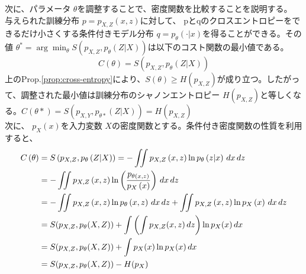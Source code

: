 \documentclass[a4paper]{jsarticle}%
\begin{document}

次に、パラメータ $ \theta $を調整することで、密度関数を比較することを説明する。\\
与えられた訓練分布 $ p = p_{X,Z} \left(x,z\right) $に対して、
pとqのクロスエントロピーをできるだけ小さくする条件付きモデル分布 $ q = p_{\theta} \left(\cdot|x\right)$を得ることができる。その値 $ \theta^* = \arg\min_{\theta} S \left(p_{X,Z},p_{\theta} \left(Z|X\right)\right) $は以下のコスト関数の最小値である。
\begin{equation*}
  C \left(\theta\right) = S \left(p_{X,Z},p_{\theta} \left(Z|X\right)\right) 
\end{equation*}
上のProp.\ref{prop:cross-entropy}により、$S \left(\theta\right) \geq H \left(p_{X,Z}\right)$が成り立つ。したがって、調整された最小値は訓練分布のシャノンエントロピー $ H \left(p_{X,Z}\right) $と等しくなる。\ie $C(\theta*)=S(p_{X,Y},p_{\theta*}(Z|X)) = H(p_{X,Z})$\\
次に、 $ p_{X} \left(x\right)$を入力変数 $ X $の密度関数とする。条件付き密度関数の性質を利用すると、
\begin{align}
  C \left(\theta\right) &= S \left(p_{X,Z}, p_{\theta} \left(Z|X\right)\right)= -\iint p_{X,Z} \left(x, z\right) \ln p_\theta \left(z|x\right) \, dx \, dz\notag\\
  &= -\iint p_{X,Z} \left(x,z\right)\ln \left(\dfrac{p_{\theta \left(x,z\right)}}{p_{X} \left(x\right)}\right)\, dx \, dz\notag \\
  &= -\iint p_{X,Z} \left(x,z\right)\ln p_{\theta} \left(x,z\right) \, dx \, dz + \iint p_{X,Z} \left(x,z\right)\ln p_{X} \left(x\right) \, dx \, dz\notag\\
  &= S(p_{X,Z}, p_\theta(X,Z)) + \int \left( \int p_{X,Z}(x, z) \, dz \right) \ln p_X(x) \, dx\label{proof}\\
  &= S(p_{X,Z}, p_\theta(X,Z)) + \int p_X(x) \ln p_X(x) \, dx\notag\\
  &= S(p_{X,Z}, p_\theta(X,Z)) - H(p_{\scriptstyle X})\notag
\end{align}
\end{document}
